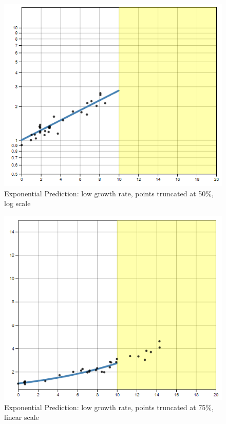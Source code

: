 \documentclass[print]{nuthesis}
\begin{document}
\begin{figure}[tbp]

{\centering \includegraphics[width=0.65\linewidth,]{images/low-10-log} 

}

\caption{Exponential Prediction: low growth rate, points truncated at 50\%, log scale}\label{fig:low-10-log}
\end{figure}

\begin{figure}[tbp]

{\centering \includegraphics[width=0.65\linewidth,]{images/low-15-linear} 

}

\caption{Exponential Prediction: low growth rate, points truncated at 75\%, linear scale}\label{fig:low-15-linear}
\end{figure}
\end{document}
